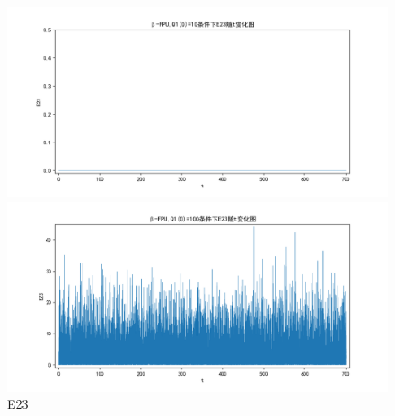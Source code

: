 \documentclass[10pt, a4paper]{article}
\begin{document}
    \begin{figure}[H]
        \begin{minipage}[t]{0.49\textwidth}
            \centering
            \includegraphics[width=\textwidth]{./q6_pics/cmp/E23.png}
        \end{minipage}
        \begin{minipage}[t]{0.49\textwidth}
            \centering
            \includegraphics[width=\textwidth]{./q6_pics/exp/E23.png}
        \end{minipage}
        \caption{E23}\label{fig:E23 in q6}
    \end{figure}
\end{document}
